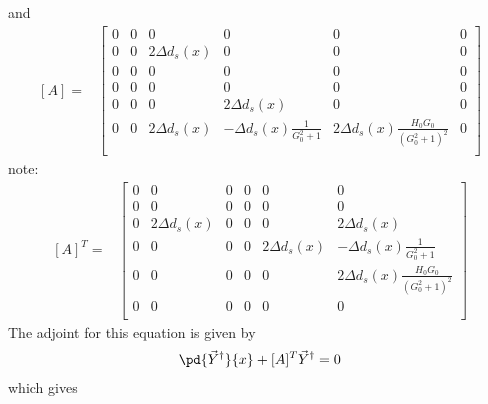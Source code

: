 and
\begin{align} \left[A\right] =
&  \left[\begin{array}{cccccc}
0 & 0 & 0              &  0                               & 0                                         & 0\\
0 & 0 & 2\Delta d_s(x) &  0                               & 0                                         & 0\\
0 & 0 & 0              &  0                               & 0                                         & 0\\ 
0 & 0 & 0              &  0                               & 0                                         & 0\\
0 & 0 & 0              &  2\Delta d_s(x)                  & 0                                         & 0\\
0 & 0 & 2\Delta d_s(x) &  -\Delta d_s(x)\frac{1}{G_0^2+1} & 2\Delta d_s(x)\frac{H_0 G_0}{(G_0^2+1)^2} & 0\\
\end{array}\right]
 \end{align}
note:
\begin{align} \left[A\right]^{T} =
&  \left[\begin{array}{cccccc}
0 & 0              & 0 & 0 & 0              & 0\\
0 & 0              & 0 & 0 & 0              & 0\\
0 & 2\Delta d_s(x) & 0 & 0 & 0              & 2\Delta d_s(x)\\ 
0 & 0              & 0 & 0 & 2\Delta d_s(x) & -\Delta d_s(x)\frac{1}{G_0^2+1}\\
0 & 0              & 0 & 0 & 0              & 2\Delta d_s(x)\frac{H_0 G_0}{(G_0^2+1)^2}\\
0 & 0              & 0 & 0 & 0              & 0\\
\end{array}\right]
 \end{align}
The adjoint for this equation is given by 
\begin{equation}
\begin{split}
\pd{\vec{Y}^{\dagger}}{x} +  [A]^T\vec{Y}^{\dagger} = 0\\
\end{split}
\end{equation}
which gives 
